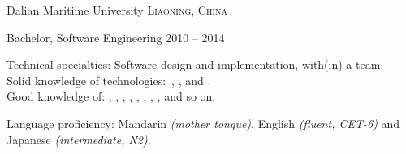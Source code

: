 \documentclass[10pt,a4paper]{article} %
\begin{document}
					
					\headedsection %
					{Dalian Maritime University}
					{\textsc{Liaoning, China}} {
						
						\headedsubsection %
						{Bachelor, Software Engineering }
						{2010 -- 2014} {}
					}
					
					\spacedhrule{0.5em}{-0.4em} %
					
					
					
					
					
					
					
					
					
					
					
					
					\inlineheadsection %
					{Technical specialties:}
					{Software design and implementation, with(in) a team.\\
						Solid knowledge of technologies:\ , ,  and .\\
						Good knowledge of: , , , , , , , ,  and so on.
					}
					
					
					\inlineheadsection %
					{Language proficiency:}
					{Mandarin \textit{(mother tongue)}, English \textit{(fluent, CET-6)} and Japanese \textit{(intermediate, N2)}.}
					
					
					\spacedhrule{1.6em}{-0.4em} %
					
					
					
					
					
\end{document}
